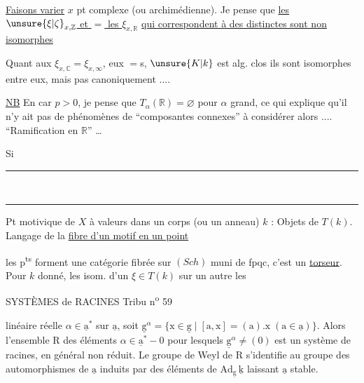 \uline{Faisons varier} $x$ pt complexe (ou  archimédienne). Je pense que \uline{les $\unsure{\xi|\zeta}_{x,\mathbb Z}$ et $=$ les $\xi_{x,\mathbb R}$}  \uline{qui correspondent à des  distinctes sont non isomorphes}

Quant aux $\xi_{x,\mathbb C}=\xi_{x,\infty}$, eux $=$s,   $\unsure{K|k}$ est  alg. clos ils sont isomorphes entre eux, mais pas canoniquement ....

\uline{NB} En car $p>0$, je pense que $T_{\alpha}(\mathbb R)=\varnothing$ pour $\alpha$ grand, ce qui explique qu'il n'y ait pas de phénomènes de ``composantes connexes'' à considérer alors .... ``Ramification en $\mathbb R$'' \ldots

Si

\begin{center}\rule{3cm}{0.5pt}\\[-0.65em]\rule{2.6cm}{0.5pt}\end{center}

Pt motivique de $X$ à valeurs dans un corps (ou un anneau) $k$ : Objets de $T(k)$. Langage de la \uline{fibre d'un motif en un point}

les p\textsuperscript{ts} forment une catégorie fibrée sur $(Sch)$ muni de fpqc,  c'est un \uline{torseur}. Pour $k$ donné, les isom. d'un  $\xi\in T(k)$ sur un autre  les

SYSTÈMES de RACINES \hfill Tribu n\textsuperscript{o} 59

linéaire réelle $\alpha\in\underline{\mathrm a}^{*}$ sur $\underline{\mathrm a}$, soit $\underline{\mathrm g}^{\alpha}=\{\mathrm x\in\underline{\mathrm g}\mid[\mathrm a,\mathrm x]=(\mathrm a).\mathrm x\;(\mathrm a\in\underline{\mathrm a})\}$. Alors l'ensemble $\mathrm R$ des éléments $\alpha\in\underline{\mathrm a}^{*}-0$ pour lesquels $\underline{\mathrm g}^{\alpha}\ne(0)$ est un système de racines, en général non réduit. Le groupe de Weyl de $\mathrm R$ s'identifie au groupe des automorphismes de $\underline{\mathrm a}$ induits par des éléments de $\mathrm{Ad}_{\underline{\mathrm g}}\,\underline{\mathrm k}$ laissant $\underline{\mathrm a}$ stable.

